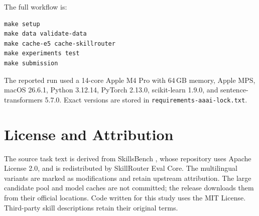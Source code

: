 \documentclass[letterpaper]{article}
\begin{document}
The full workflow is:
\begin{verbatim}
make setup
make data validate-data
make cache-e5 cache-skillrouter
make experiments test
make submission
\end{verbatim}

The reported run used a 14-core Apple M4 Pro with 64\,GB memory, Apple MPS,
macOS 26.6.1, Python 3.12.14, PyTorch 2.13.0, scikit-learn 1.9.0, and
sentence-transformers 5.7.0.  Exact versions are stored in
\texttt{requirements-aaai-lock.txt}.

\section{License and Attribution}

The source task text is derived from SkillsBench \cite{li2026skillsbench},
whose repository uses Apache License 2.0, and is redistributed by SkillRouter
Eval Core.  The multilingual
variants are marked as modifications and retain upstream attribution.  The
large candidate pool and model caches are not committed; the release downloads
them from their official locations.  Code written for this study uses the MIT
License.  Third-party skill descriptions retain their original terms.


\end{document}
